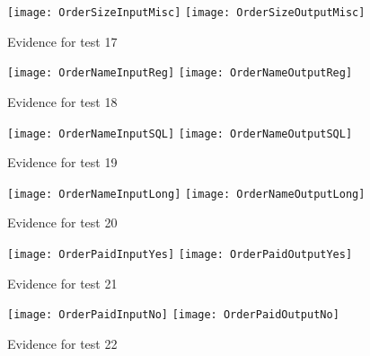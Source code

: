 \documentclass[
11pt, %
a4paper, %
oneside, %
headinclude,footinclude, %
BCOR5mm, %
]{scrartcl}
\begin{document}
\begin{appendices}
{{{{{{{{{{{{{{\begin{figure}[H]
\end{figure}
\begin{figure}[H]
	\centering
	\texttt{[image: OrderSizeInputMisc]}
	\texttt{[image: OrderSizeOutputMisc]}
	\caption[Evidence C.1.2 Test 17]{Evidence for test 17}
	\label{orddettes17}	
\end{figure}
\begin{figure}[H]
	\centering
	\texttt{[image: OrderNameInputReg]}
	\texttt{[image: OrderNameOutputReg]}
	\caption[Evidence C.1.2 Test 18]{Evidence for test 18}
	\label{orddettes18}	
\end{figure}
\begin{figure}[H]
	\centering
	\texttt{[image: OrderNameInputSQL]}
	\texttt{[image: OrderNameOutputSQL]}
	\caption[Evidence C.1.2 Test 19]{Evidence for test 19}
	\label{orddettes19}	
\end{figure}
\begin{figure}[H]
	\centering
	\texttt{[image: OrderNameInputLong]}
	\texttt{[image: OrderNameOutputLong]}
	\caption[Evidence C.1.2 Test 20]{Evidence for test 20}
	\label{orddettes20}	
\end{figure}
\begin{figure}[H]
	\centering
	\texttt{[image: OrderPaidInputYes]}
	\texttt{[image: OrderPaidOutputYes]}
	\caption[Evidence C.1.2 Test 21]{Evidence for test 21}
	\label{orddettes21}	
\end{figure}
\begin{figure}[H]
	\centering
	\texttt{[image: OrderPaidInputNo]}
	\texttt{[image: OrderPaidOutputNo]}
	\caption[Evidence C.1.2 Test 22]{Evidence for test 22}
	\label{orddettes22}	
\end{figure}
}}}}}}}}}}}}}}
\end{appendices}
\end{document}
